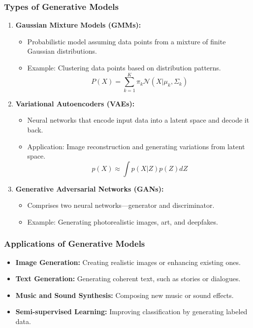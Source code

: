 \documentclass[aspectratio=169]{beamer}
\begin{document}
\begin{frame}[fragile]
    \frametitle{Types of Generative Models}
    \begin{enumerate}
        \item \textbf{Gaussian Mixture Models (GMMs):}
            \begin{itemize}
                \item Probabilistic model assuming data points from a mixture of finite Gaussian distributions.
                \item Example: Clustering data points based on distribution patterns.
                \[
                P(X) = \sum_{k=1}^{K} \pi_k \mathcal{N}(X | \mu_k, \Sigma_k)
                \]
            \end{itemize}
        
        \item \textbf{Variational Autoencoders (VAEs):} 
            \begin{itemize}
                \item Neural networks that encode input data into a latent space and decode it back.
                \item Application: Image reconstruction and generating variations from latent space.
                \[
                p(X) \approx \int p(X|Z)p(Z)dZ
                \]
            \end{itemize}
        
        \item \textbf{Generative Adversarial Networks (GANs):}
            \begin{itemize}
                \item Comprises two neural networks—generator and discriminator.
                \item Example: Generating photorealistic images, art, and deepfakes.
            \end{itemize}
    \end{enumerate}
\end{frame}

\begin{frame}[fragile]
    \frametitle{Applications of Generative Models}
    \begin{itemize}
        \item \textbf{Image Generation:} Creating realistic images or enhancing existing ones.
        \item \textbf{Text Generation:} Generating coherent text, such as stories or dialogues.
        \item \textbf{Music and Sound Synthesis:} Composing new music or sound effects.
        \item \textbf{Semi-supervised Learning:} Improving classification by generating labeled data.
    \end{itemize}
\end{frame}
\end{document}
